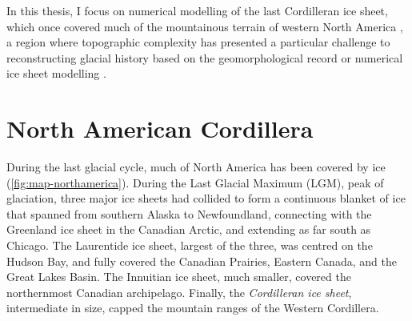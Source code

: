 \documentclass[a4paper]{kappa}
\begin{document}
In this thesis, I focus on numerical modelling of the last Cordilleran ice
sheet, which once covered much of the mountainous terrain of western North
America \citep{Dawson.1888}, a region where topographic complexity has
presented a particular challenge to reconstructing glacial history based on the
geomorphological record \citep[e.g.,][]{Kleman.etal.2010} or numerical ice
sheet modelling \citep{Robert.1991}.


\section{North American Cordillera}

During the last glacial cycle, much of North America has been covered by ice
(\cref{fig:map-northamerica}). During the Last Glacial Maximum (LGM), peak of
glaciation, three major ice sheets had collided to
form a continuous blanket of ice that spanned from southern Alaska to
Newfoundland, connecting with the Greenland ice sheet in the Canadian Arctic,
and extending as far south as Chicago.
The Laurentide ice sheet, largest of the three, was centred on the Hudson Bay,
and fully covered the Canadian Prairies, Eastern Canada, and the Great Lakes
Basin. The Innuitian ice sheet, much smaller, covered the northernmost Canadian
archipelago. Finally, the \emph{Cordilleran ice sheet}, intermediate in size,
capped the mountain
ranges of the Western Cordillera.
\end{document}
